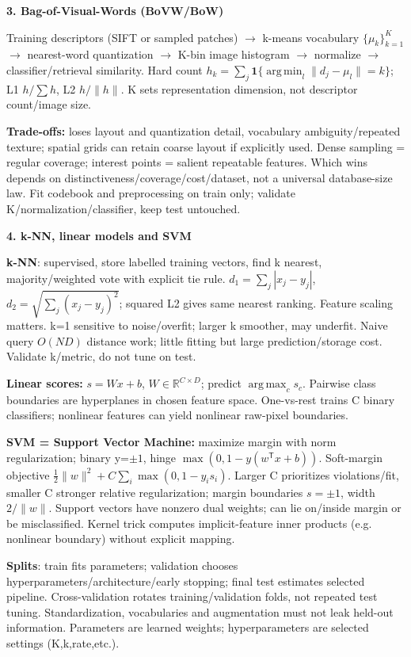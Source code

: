 \documentclass[a4paper]{article}
\newcommand{\key}[1]{\textbf{#1}}
\newcommand{\Topic}[1]{\par\vspace{1.7pt}\noindent
  {\fontsize{7.7}{8.0}\selectfont\bfseries #1}\par\vspace{0.3pt}}
\newcommand{\norm}[1]{\lVert #1\rVert}
\newcommand{\trans}{^{\mathsf T}}
\newcommand{\R}{\mathbb R}
\newcommand{\argmin}{\operatorname*{arg\,min}}
\newcommand{\argmax}{\operatorname*{arg\,max}}
\newcounter{sheet}
\newcounter{sheetcolumn}
\newlength{\colwidth}
\newenvironment{sheetcol}[1][7.0]{\stepcounter{sheetcolumn}
  \begin{lrbox}{\columnbox}\begin{minipage}[t]{\colwidth}\vspace{0pt}
  \fontsize{#1}{\dimexpr#1pt+0.6pt\relax}\selectfont}
  {\end{minipage}\end{lrbox}
  \typeout{CV1COL|\thesheet|\thesheetcolumn|\the\dimexpr\ht\columnbox+\dp\columnbox\relax}
  \usebox{\columnbox}\ignorespacesafterend}
\begin{document}
\begin{sheetcol}
\Topic{3. Bag-of-Visual-Words (BoVW/BoW)}
Training descriptors (SIFT or sampled patches) \(\to\) k-means vocabulary \(\{\mu_k\}_{k=1}^K\) \(\to\) nearest-word quantization \(\to\) K-bin image histogram \(\to\) normalize \(\to\) classifier/retrieval similarity. Hard count \(h_k=\sum_j\mathbf1\{\argmin_l\norm{d_j-\mu_l}=k\}\); L1 \(h/\sum h\), L2 \(h/\norm h\). K sets representation dimension, not descriptor count/image size.

\key{Trade-offs:} loses layout and quantization detail, vocabulary ambiguity/repeated texture; spatial grids can retain coarse layout if explicitly used. Dense sampling = regular coverage; interest points = salient repeatable features. Which wins depends on distinctiveness/coverage/cost/dataset, not a universal database-size law. Fit codebook and preprocessing on train only; validate K/normalization/classifier, keep test untouched.

\Topic{4. k-NN, linear models and SVM}
\key{k-NN}: supervised, store labelled training vectors, find k nearest, majority/weighted vote with explicit tie rule. \(d_1=\sum_j|x_j-y_j|\), \(d_2=\sqrt{\sum_j(x_j-y_j)^2}\); squared L2 gives same nearest ranking. Feature scaling matters. k=1 sensitive to noise/overfit; larger k smoother, may underfit. Naive query \(O(ND)\) distance work; little fitting but large prediction/storage cost. Validate k/metric, do not tune on test.

\key{Linear scores:} \(s=Wx+b\), \(W\in\R^{C\times D}\); predict \(\argmax_c s_c\). Pairwise class boundaries are hyperplanes in chosen feature space. One-vs-rest trains C binary classifiers; nonlinear features can yield nonlinear raw-pixel boundaries.

\key{SVM = Support Vector Machine:} maximize margin with norm regularization; binary y=\(\pm1\), hinge \(\max(0,1-y(w\trans x+b))\). Soft-margin objective \(\tfrac12\norm w^2+C\sum_i\max(0,1-y_is_i)\). Larger C prioritizes violations/fit, smaller C stronger relative regularization; margin boundaries \(s=\pm1\), width \(2/\norm w\). Support vectors have nonzero dual weights; can lie on/inside margin or be misclassified. Kernel trick computes implicit-feature inner products (e.g. nonlinear boundary) without explicit mapping.

\key{Splits}: train fits parameters; validation chooses hyperparameters/architecture/early stopping; final test estimates selected pipeline. Cross-validation rotates training/validation folds, not repeated test tuning. Standardization, vocabularies and augmentation must not leak held-out information. Parameters are learned weights; hyperparameters are selected settings (K,k,rate,etc.).


\end{sheetcol}
\end{document}
